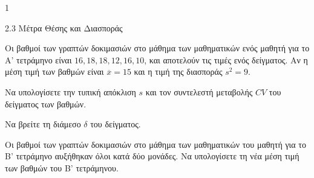 \begin{ylh}{1}
    \item 2.3 Μέτρα Θέσης και Διασποράς
\end{ylh}
Οι βαθμοί των γραπτών δοκιμασιών στο μάθημα των μαθηματικών ενός μαθητή για το Α' τετράμηνο είναι $16,18,18,12,16,10$, και αποτελούν τις τιμές ενός δείγματος. Αν η μέση τιμή των βαθμών είναι $\overline{x} =15$ και η τιμή της διασποράς $s^2 = 9$.
\begin{alist}
    \item Να υπολογίσετε την τυπική απόκλιση $s$ και τον συντελεστή μεταβολής $CV$ του δείγματος των βαθμών. 
    \item Να βρείτε τη διάμεσο $\delta$ του δείγματος. 
    \item Οι βαθμοί των γραπτών δοκιμασιών στο μάθημα των μαθηματικών του μαθητή για το Β' τετράμηνο αυξήθηκαν όλοι κατά δύο μονάδες. Να υπολογίσετε τη νέα μέση τιμή των βαθμών του Β' τετράμηνου. 
\end{alist}

